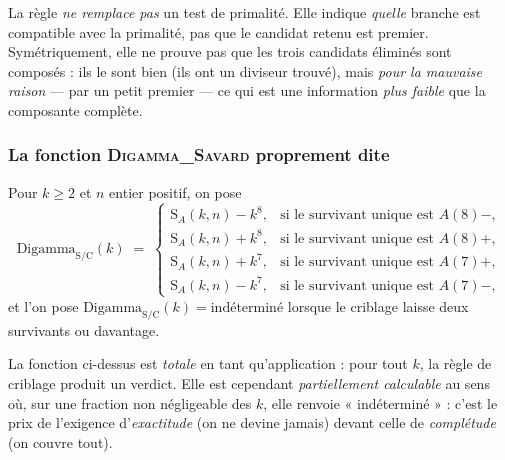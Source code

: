 \documentclass[11pt,a4paper]{article}
\newcommand{\SA}{\mathrm{S}_A}
\begin{document}
\vspace{0.3cm}
\begin{boitealerte}
La règle \emph{ne remplace pas} un test de primalité. Elle indique
\emph{quelle} branche est compatible avec la primalité, pas que le
candidat retenu est premier. Symétriquement, elle ne prouve pas que les
trois candidats éliminés sont composés : ils le sont bien (ils ont un
diviseur trouvé), mais \emph{pour la mauvaise raison} --- par un petit
premier --- ce qui est une information \emph{plus faible} que la
composante complète.
\end{boitealerte}

\subsubsection{La fonction \textsc{Digamma\_Savard} proprement dite}

\vspace{0.3cm}
\begin{boiteformule}
Pour $k \ge 2$ et $n$ entier positif, on pose
\[
  \mathrm{Digamma}_{\mathrm{S/C}}(k) \;=\;
  \begin{cases}
    \SA(k,n) - k^{8}, & \text{si le survivant unique est } A(8)-,\\
    \SA(k,n) + k^{8}, & \text{si le survivant unique est } A(8)+,\\
    \SA(k,n) + k^{7}, & \text{si le survivant unique est } A(7)+,\\
    \SA(k,n) - k^{7}, & \text{si le survivant unique est } A(7)-,
  \end{cases}
\]
et l'on pose $\mathrm{Digamma}_{\mathrm{S/C}}(k) = \text{indéterminé}$
lorsque le criblage laisse deux survivants ou davantage.
\end{boiteformule}

\vspace{0.3cm}
\begin{boitenote}
La fonction ci-dessus est \emph{totale} en tant qu'application : pour
tout $k$, la règle de criblage produit un verdict. Elle est cependant
\emph{partiellement calculable} au sens où, sur une fraction non
négligeable des $k$, elle renvoie « indéterminé » : c'est le prix de
l'exigence d'\emph{exactitude} (on ne devine jamais) devant celle de
\emph{complétude} (on couvre tout).
\end{boitenote}
\end{document}
